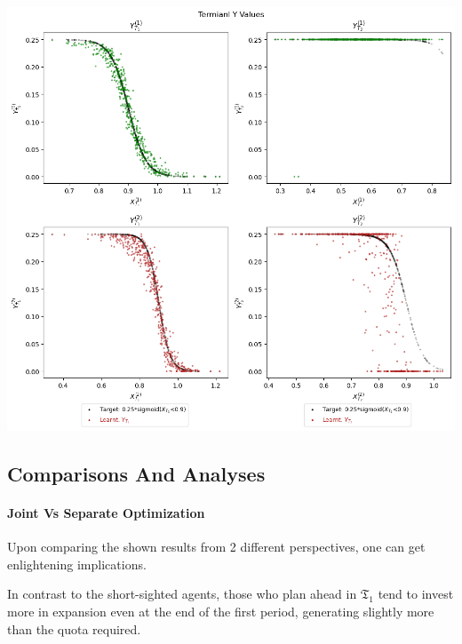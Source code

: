 \documentclass[a4paper,10pt]{article}
\newcommand{\1}{\mathbf{1}}
\begin{document}
\begin{center}
  \begin{minipage}[ht]{0.9\textwidth}
    \centering
    \includegraphics[]{FinalReports/Illustration_diagrams/Seprt-2A2P-Sigmoid-ResExamples/sigmoid_target.png}\\
    \label{fig:terminal-values-sep}
  \end{minipage}
\end{center}

\vfill
\subsection{Comparisons And Analyses}

\paragraph{Joint Vs Separate Optimization}

Upon comparing the shown results from 2 different perspectives, one can
get enlightening implications.

In contrast to the short-sighted agents, those who plan ahead in \textbf{\(\mathfrak{T}_1\)} tend to invest more in expansion even at the end of the first period, generating slightly more than the quota required.
\end{document}

